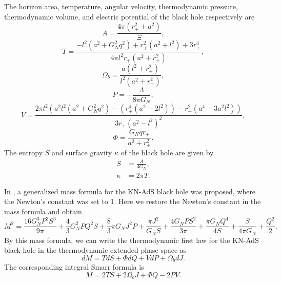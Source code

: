 \documentclass[a4paper,11pt]{article}
\begin{document}
The horizon area, temperature,  angular velocity, thermodynamic pressure, thermodynamic volume, and electric potential of the black hole respectively are
\begin{equation}
A=\frac{4 \pi\left(r_{+}^2+a^2\right)}{\Xi},
\end{equation}
\begin{equation}
T=\frac{-l^2 \left(a^2+G_N^2 q^2\right)+r_+^2 \left(a^2+l^2\right)+3 r_+^4}{4 \pi  l^2 r_+ \left(a^2+r_+^2\right)},
\end{equation}
\begin{equation}
\Omega_b=\frac{a \left(l^2+r_+^2\right)}{l^2 \left(a^2+r_+^2\right)},
\end{equation}
\begin{equation}\label{preb}
P=-\frac{\Lambda}{8\pi G_N},
\end{equation}
\begin{equation}
V=\frac{2 \pi  l^2 \left(a^2 l^2 \left(a^2+G_N^2 q^2\right)-\left(r_+^4 \left(a^2-2 l^2\right)\right)-r_+^2 \left(a^4-3 a^2 l^2\right)\right)}{3 r_+ \left(a^2-l^2\right)^2},
\end{equation}
\begin{equation}
\Phi=\frac{G_N qr_+}{a^2+r_+^2}.
\end{equation}
The entropy $S$ and surface gravity $\kappa$ of the black hole are given by
\begin{align}\label{entb}
S&=\frac{A}{4G_N},\\
\kappa&=2\pi T.\label{kapt}
\end{align}

In \cite{Caldarelli:1999xj}, a generalized mass formula for the KN-AdS black hole was proposed, where the Newton's constant was set to 1. Here we restore the Newton's constant in the mass formula and obtain
\begin{equation}\label{mass1}
M^2=\frac{16 G_N^3 P^2 S^3}{9 \pi }+\frac{4}{3} G_N^2 P Q^2 S+\frac{8}{3} \pi  G_N J^2 P+\frac{\pi  J^2}{G_N S}+\frac{4 G_N P S^2}{3 \pi }+\frac{\pi  G_N Q^4}{4 S}+\frac{S}{4 \pi  G_N}+\frac{Q^2}{2}.
\end{equation}
By this mass formula, we can write the thermodynamic first law for the KN-AdS black hole in the thermodynamic extended phase space as
\begin{equation}\label{beps}
dM=TdS+\Phi dQ+VdP+\Omega_b dJ.
\end{equation}
The corresponding integral Smarr formula is
\begin{equation}\label{bsm}
M=2TS+2\Omega_b J+\Phi Q-2PV.
\end{equation}
\end{document}
